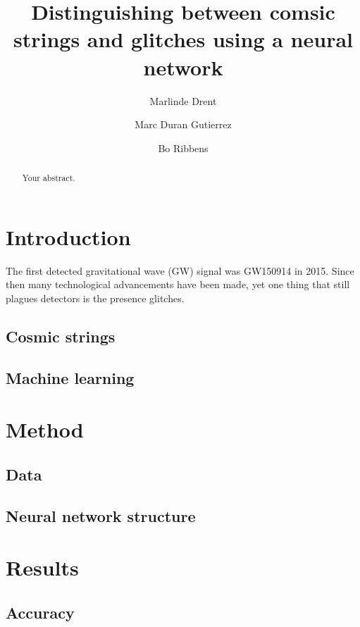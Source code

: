 \documentclass{article}
\title{\bf{Distinguishing between comsic strings and glitches using a neural network}}
\author[1]{Marlinde Drent}
\author[1]{Marc Duran Gutierrez}
\author[1]{Bo Ribbens}
\affil[1]{\it{Department of Physics, Utrecht University}}
\begin{document}
\maketitle

\begin{abstract}
Your abstract.
\end{abstract}

\begin{multicols}{2}
\section{Introduction}
The first detected gravitational wave (GW) signal was GW150914\cite{PhysRevLett.116.061102} in 2015. 
Since then many technological advancements have been made, yet one thing that still plagues detectors is the presence glitches.    

\subsection{Cosmic strings}

\subsection{Machine learning}


\section{Method}
\subsection{Data}

\subsection{Neural network structure}

\section{Results}
\subsection{Accuracy}


\end{multicols}
\end{document}
